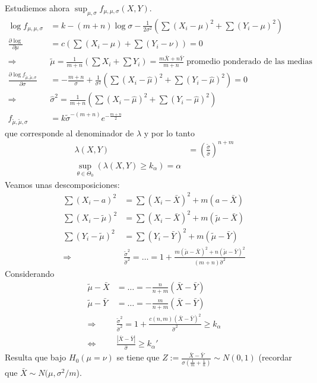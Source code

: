 \documentclass[10pt]{article}
\theoremstyle{plain}
\theoremstyle{definition}
\begin{document}
Estudiemos ahora $\sup_{\mu,\sigma}f_{\mu,\mu,\sigma}(X,Y)$.
\begin{align*}
\log f_{\mu,\mu,\sigma} &= k- (m+n)\log \sigma - \frac{1}{2\sigma^2}\left(\sum (X_{i}-\mu)^2+\sum (Y_{i}-\mu)^2\right)\\
\frac{\partial \log}{\partial \mu} &= c\left(\sum (X_{i}-\mu) + \sum (Y_{i}-\nu)\right) = 0\\
\Rightarrow &\tilde{\mu} = \frac{1}{m+n}\left(\sum X_{i}+ \sum Y_{i}\right) = \frac{m\bar{X}+n\bar{Y}}{m+n} \text{ promedio ponderado de las medias}\\
\frac{\partial \log f_{\tilde{\mu},\tilde{\mu},\sigma}}{\partial \sigma} &= -\frac{m+n}{\sigma} + \frac{1}{\sigma^2}\left(\sum (X_{i}-\hat{\mu})^2+\sum (Y_{i}-\hat{\mu})^2\right)  = 0\\
\Rightarrow & \hat{\sigma}^2 = \frac{1}{m+n}\left(\sum (X_{i}-\hat{\mu})^2+\sum (Y_{i}-\hat{\mu})^2\right)\\
f_{\tilde{\mu},\tilde{\mu},\sigma} &= k \tilde{\sigma}^{-(m+n)}e^{-\frac{m+n}{2}}
\end{align*}
que corresponde al denominador de $\lambda$ y por lo tanto
\begin{align*}
\lambda(X,Y) &= \left(\frac{\tilde{\sigma}}{\hat{\sigma}}\right)^{n+m}\\
\sup_{\theta\in\Theta_{0}}(\lambda(X,Y)\ge k_{\alpha}) = \alpha
\end{align*}
Veamos unas descomposiciones:
\begin{align*}
\sum (X_{i}-a)^2 &= \sum (X_{i}-\bar{X})^2 + m (a-\bar{X})\\
\sum (X_{i}-\tilde{\mu})^2 &= \sum (X_{i}-\bar{X})^2 + m (\tilde{\mu}-\bar{X})\\
\sum (Y_{i}-\tilde{\mu})^2 &= \sum (Y_{i}-\bar{Y})^2 + m (\tilde{\mu}-\bar{Y})\\
\Rightarrow & \frac{\tilde{\sigma}^2}{\hat{\sigma}^2} = \ldots = 1+\frac{m(\tilde{\mu}-\bar{X})^2+n(\tilde{\mu}-\bar{Y})^2}{(m+n)\hat{\sigma}^2}
\end{align*}
Considerando
\begin{align*}
\tilde{\mu}-\bar{X} &= \ldots = -\frac{n}{n+m}(\bar{X}-\bar{Y})\\
\tilde{\mu}-\bar{Y} &= \ldots = -\frac{m}{n+m}(\bar{X}-\bar{Y})\\
\Rightarrow & \frac{\tilde{\sigma}^2}{\hat{\sigma}^2} = 1+\frac{c(n,m)(\bar{X}-\bar{Y})^2}{\hat{\sigma}^2} \ge k_{\alpha}\\
\Leftrightarrow & \frac{|\bar{X}-\bar{Y}|}{\hat{\sigma}} \ge k_{\alpha}'
\end{align*}
Resulta que bajo $H_{0} (\mu=\nu)$ se tiene que $Z:= \frac{\bar{X}-\bar{Y}}{\sigma\left(\frac{1}{m}+\frac{1}{n}\right)}\sim N(0,1)$ (recordar que $\bar{X} \sim N(\mu,\sigma^2/m$).\\
\end{document}
